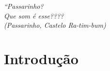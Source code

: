 \documentclass[
	oldfontcommands,
	sumario=tradicional,
	12pt,      %
	openright, %
	oneside,   %
	a4paper,   %
	english, %
	brazil   %
	]{00-configs/imecc-unicamp}
\begin{document}
			\begin{epigrafe}
				\vspace*{\fill}
				\begin{flushright}
				\textit{``Passarinho? \\
					Que som é esse???? \\
					(Passarinho, Castelo Ra-tim-bum)
				}
				\end{flushright}
			\end{epigrafe}
		
			
		
		
		
		
			
			
			
			\tableofcontents*
			\cleardoublepage
		
		\textual
		
		\chapter{Introdução} \label{cap_intro} %
		
		
\end{document}
